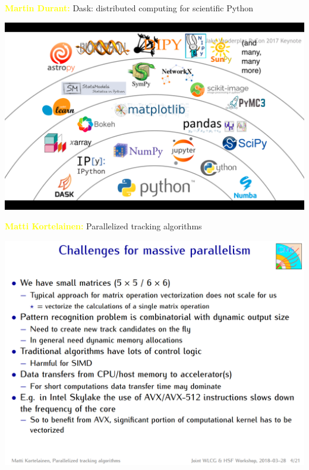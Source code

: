 \documentclass[aspectratio=169]{beamer}
\begin{document}
\begin{frame}{\textcolor{yellow}{\bf Martin Durant:} Dask: distributed computing for scientific Python}
\vspace{0.1 cm}
\begin{center}
\includegraphics[width=0.88\linewidth]{dask-3.png}
\end{center}
\end{frame}

\begin{frame}{\textcolor{yellow}{\bf Matti Kortelainen:} Parallelized tracking algorithms}
\vspace{0.13 cm}
\begin{center}
\includegraphics[width=0.73\linewidth]{tracking-1.png}
\end{center}
\end{frame}
\end{document}
